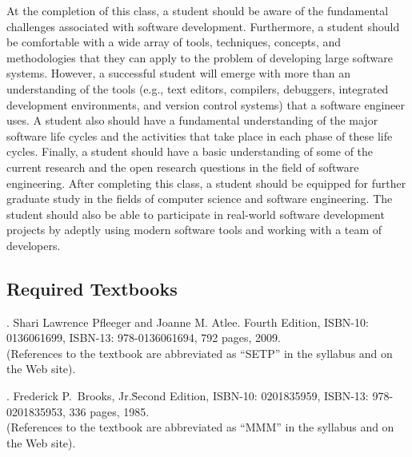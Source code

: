 At the completion of this class, a student should be aware of the fundamental challenges associated with software
development.  Furthermore, a student should be comfortable with a wide array of tools, techniques, concepts, and
methodologies that they can apply to the problem of developing large software systems.  However, a successful student
will emerge with more than an understanding of the tools (e.g., text editors, compilers, debuggers, integrated
development environments, and version control systems) that a software engineer uses.  A student also should have a
fundamental understanding of the major software life cycles and the activities that take place in each phase of these
life cycles.  Finally, a student should have a basic understanding of some of the current research and the open research
questions in the field of software engineering.  After completing this class, a student should be equipped for further
graduate study in the fields of computer science and software engineering.  The student should also be able to
participate in real-world software development projects by adeptly using modern software tools and working with a team of
developers.

\subsection*{Required Textbooks}


. Shari Lawrence Pfleeger and Joanne M. Atlee.
Fourth Edition, ISBN-10: 0136061699, ISBN-13: 978-0136061694, 792 pages, 2009. \\
(References to the textbook are abbreviated as ``SETP'' in the syllabus and on the Web site).


. Frederick P.\ Brooks, Jr.\.
Second Edition, ISBN-10: 0201835959, ISBN-13: 978-0201835953, 336 pages, 1985. \\
(References to the textbook are abbreviated as ``MMM'' in the syllabus and on the Web site).

